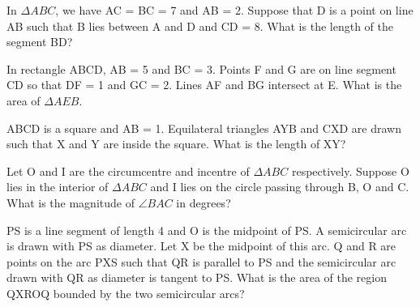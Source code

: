 \item In $\Delta ABC$, we have AC = BC = 7 and AB = 2. Suppose that D is a point on line AB such that B lies between A and D and CD = 8. What is the length of the segment BD?

\item In rectangle ABCD, AB = 5 and BC = 3. Points F and G are on line segment CD so that DF = 1 and GC = 2. Lines AF and BG intersect at E. What is the area of $\Delta AEB$.

\item ABCD is a square and AB = 1. Equilateral triangles AYB and  CXD are drawn such that X and Y are inside the square. What is the length of XY?

\item Let O and I are the circumcentre and incentre of $\Delta ABC$ respectively. Suppose O lies in the interior of 
$\Delta ABC$ and I lies on the circle passing through B, O and C. What is the magnitude of $\angle BAC$ in degrees?

\item PS is a line segment of length 4 and O is the midpoint of PS. A semicircular arc is drawn with PS as diameter. Let X be the midpoint of this arc. Q and R are points on the arc PXS such that QR is parallel to PS and the semicircular arc drawn with QR as diameter is tangent to PS. What is the area of the region QXROQ bounded by the two semicircular arcs?


